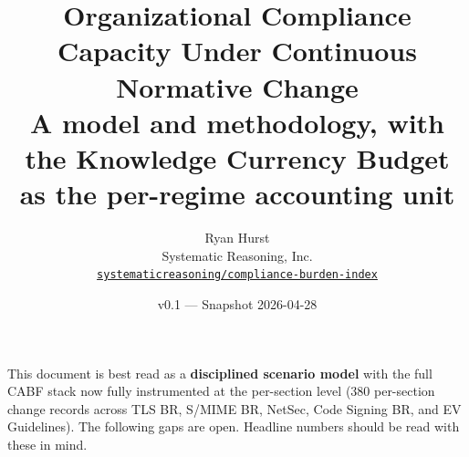 \documentclass[11pt,letterpaper]{article}
\title{\textbf{Organizational Compliance Capacity Under Continuous Normative Change} \\[0.4em]
       \large A model and methodology, with the Knowledge Currency Budget as the per-regime accounting unit}
\author{Ryan Hurst \\
        Systematic Reasoning, Inc. \\
        \href{https://github.com/systematicreasoning/compliance-burden-index}{\texttt{systematicreasoning/compliance-burden-index}}}
\date{v0.1 --- Snapshot 2026-04-28}
\begin{document}
\maketitle

\begin{tcolorbox}[
    breakable,
    enhanced,
    colback=calloutbg,
    colframe=calloutborder,
    arc=2pt,
    boxrule=0.6pt,
    leftrule=3pt,
    title={\textbf{Known data gaps in v0.1}},
    coltitle=black,
    fonttitle=\sffamily\bfseries,
    colbacktitle=calloutbg,
    attach boxed title to top left={xshift=10pt, yshift=-7pt},
    boxed title style={colback=calloutbg, colframe=calloutbg, sharp corners}
]
\small
\setlength{\parskip}{2pt}
This document is best read as a \textbf{disciplined scenario model} with the full CABF stack now fully instrumented at the per-section level (380 per-section change records across TLS BR, S/MIME BR, NetSec, Code Signing BR, and EV Guidelines). The following gaps are open. Headline numbers should be read with these in mind.


\end{tcolorbox}
\end{document}
